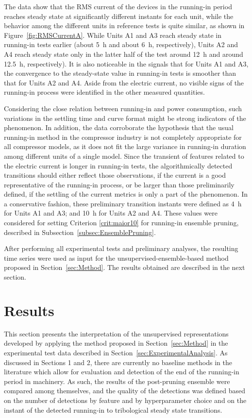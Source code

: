 \documentclass[preprint,11pt,number]{elsarticle}
\begin{document}
The data show that the RMS current of the devices in the running-in period reaches steady state at significantly different instants for each unit, while the behavior among the different units in reference tests is quite similar, as shown in Figure~\ref{fig:RMSCurrentA}. While Units A1 and A3 reach steady state in running-in tests earlier (about  \SI{5}{\hour} and about \SI{6}{\hour}, respectively), Units A2 and A4 reach steady state only in the latter half of the test around \SI{12}{\hour} and around \SI{12.5}{\hour}, respectively). It is also noticeable in the signals that for Units A1 and A3, the convergence to the steady-state value in running-in tests is smoother than that for Units A2 and A4. Aside from the electric current, no visible signs of the running-in process were identified in the other measured quantities.

Considering the close relation between running-in and power consumption, such variations in the settling time and curve format might be strong indicators of the phenomenon. In addition, the data corroborate the hypothesis that the usual running-in method in the compressor industry is not completely appropriate for all compressor models, as it does not fit the large variance in running-in duration among different units of a single model. Since the transient of features related to the electric current is longer in running-in tests, the algorithmically detected transitions should either reflect those observations, if the current is a good representative of the running-in process, or be larger than those preliminarily defined, if the settling of the current metrics is only a part of the phenomenon. In a conservative fashion, these preliminary transition instants were defined as \SI{4}{\hour} for Units A1 and A3; and \SI{10}{\hour} for Units A2 and A4. These values were considered for setting Criterion \ref{crit:maior10} for running-in ensemble pruning, described in Subsection~\ref{subsec:EnsemblePruning}.

After performing all experimental tests and preliminary analyses, the resulting time series were used as input for the unsupervised-ensemble-based method proposed in Section~\ref{sec:Method}. The results obtained are described in the next section.

\section{Results}\label{sec:Results}

This section presents the interpretation of the unsupervised representations developed by applying the method proposed in Section~\ref{sec:Method} in the experimental test data described in Section~\ref{sec:ExperimentalAnalysis}. As discussed in Sections 1 and 2, there are currently no baseline methods in the literature which allow for evaluation and detection of the end of the running-in period in machinery. As such, the results of the post-pruning ensemble were compared among themselves, and the quality of the detections was defined based on the number of detections by feature and by hyperparameter choice and on the instant of the detected running-in to tribological steady state transitions.
\end{document}
